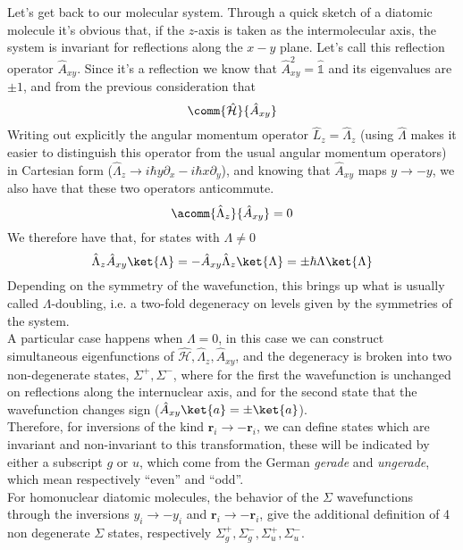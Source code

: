 \documentclass[a4paper, 11pt]{book}
\renewcommand{\vec}[1]{\mathbf{#1}}
\newcommand{\1}{\opr{\mathds{1}}}
\newcommand{\ham}{\mathcal{H}}
\newcommand{\opr}[1]{\hat{#1}}
\theoremstyle{plain}
\begin{document}
	Let's get back to our molecular system. Through a quick sketch of a diatomic molecule it's obvious that, if the $z$-axis is taken as the intermolecular axis, the system is invariant for reflections along the $x-y$ plane. Let's call this reflection operator $\opr{A}_{xy}$. Since it's a reflection we know that $\opr{A}_{xy}^2=\1$ and its eigenvalues are $\pm1$, and from the previous consideration that
	\begin{equation*}
		\comm{\opr{\ham}}{\opr{A}_{xy}}
	\end{equation*}
	Writing out explicitly the angular momentum operator $\opr{L}_z=\opr{\Lambda}_z$ (using $\opr{\Lambda}$ makes it easier to distinguish this operator from the usual angular momentum operators) in Cartesian form ($\opr{\Lambda}_z\to i\hbar y\partial_x-i\hbar x\partial_y$), and knowing that $\opr{A}_{xy}$ maps $y\to -y$, we also have that these two operators anticommute.
	\begin{equation*}
		\acomm{\opr{\Lambda}_z}{\opr{A}_{xy}}=0
	\end{equation*}
	We therefore have that, for states with $\Lambda\ne0$
	\begin{equation}
		\opr{\Lambda}_z\opr{A}_{xy}\ket{\Lambda}=-\opr{A}_{xy}\opr{\Lambda}_z\ket{\Lambda}=\pm\hbar\Lambda\ket{\Lambda}
		\label{eq:xyreflection}
	\end{equation}
	Depending on the symmetry of the wavefunction, this brings up what is usually called $\Lambda$-doubling, i.e. a two-fold degeneracy on levels given by the symmetries of the system.\\
	A particular case happens when $\Lambda=0$, in this case we can construct simultaneous eigenfunctions of $\opr{\ham},\opr{\Lambda}_z,\opr{A}_{xy}$, and the degeneracy is broken into two non-degenerate states, $\Sigma^+,\Sigma^-$, where for the first the wavefunction is unchanged on reflections along the internuclear axis, and for the second state that the wavefunction changes sign ($\opr{A}_{xy}\ket{a}=\pm\ket{a}$).\\
	Therefore, for inversions of the kind $\vec{r}_i\to-\vec{r}_i$, we can define states which are invariant and non-invariant to this transformation, these will be indicated by either a subscript $g$ or $u$, which come from the German \textit{gerade} and \textit{ungerade}, which mean respectively ``even'' and ``odd''.\\
	For homonuclear diatomic molecules, the behavior of the $\Sigma$ wavefunctions through the inversions $y_i\to-y_i$ and $\vec{r}_i\to-\vec{r}_i$, give the additional definition of 4 non degenerate $\Sigma$ states, respectively $\Sigma_g^+,\Sigma_g^-,\Sigma_u^+,\Sigma_u^-$.\\
\end{document}
